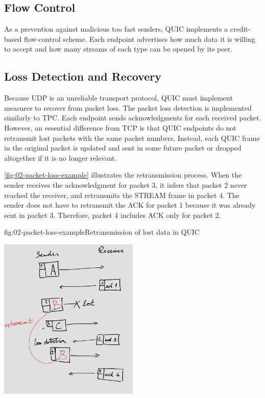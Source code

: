 
\subsection{Flow Control}

As a prevention against malicious too fast senders, QUIC implements a credit-based flow-control
scheme. Each endpoint advertises how much data it is willing to accept and how many streams of each
type can be opened by its peer.

\subsection{Loss Detection and Recovery}

Because UDP is an unreliable transport protocol, QUIC must implement measures to recover from packet
loss. The packet loss detection is implemented similarly to TPC. Each endpoint sends acknowledgments
for each received packet. However, an essential difference from TCP is that QUIC endpoints do not
retransmit lost packets with the same packet numbers. Instead, each QUIC frame in the original
packet is updated and sent in some future packet or dropped altogether if it is no longer relevant.

\autoref{fig:02-packet-loss-example} illustrates the retransmission process. When the sender
receives the acknowledgment for packet 3, it infers that packet 2 never reached the receiver, and
retransmits the STREAM frame in packet 4. The sender does not have to retransmit the ACK for packet
1 because it was already sent in packet 3. Therefore, packet 4 includes ACK only for packet 2.


\begin{myFigure}{fig:02-packet-loss-example}{Retransmission of lost data in QUIC}

\includegraphics[width=0.5\textwidth]{img/02-retransmission-example}

\end{myFigure}

